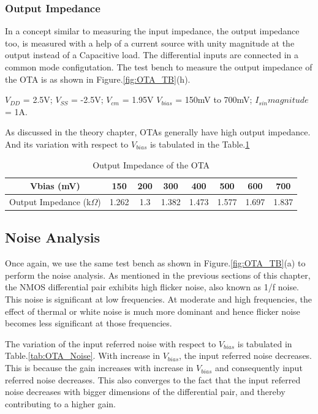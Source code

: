\subsubsection{Output Impedance}
In a concept similar to measuring the input impedance, the output impedance too, is measured with a help of a current source with unity magnitude at the output instead of a Capacitive load. The differential inputs are connected in a common mode configutation. The test bench to measure the output impedance of the OTA is as shown in Figure.\ref{fig:OTA_TB}(h).

$V_{DD}$ = 2.5V; $V_{SS}$ = -2.5V; $V_{cm}$ = 1.95V $V_{bias}$ = 150mV to 700mV; $I_{sin} magnitude$ = 1A. 
 
As discussed in the theory chapter, OTAs generally have high output impedance. And its variation with respect to $V_{bias}$ is tabulated in the Table.\ref{tab:OTA_ZOUT}
\begin{table} [H]
\centering
\begin{tabular}{@{}cccccccc@{}}
\toprule
Vbias (mV)					& 150		& 200			& 300			& 400			& 500			& 600			& 700 \\ \midrule
Output Impedance (k$\Omega$)			& 1.262		& 1.3		& 1.382		& 1.473		& 1.577		& 1.697		& 1.837 \\
\bottomrule
\end{tabular}
\caption{Output Impedance of the OTA}
\label{tab:OTA_ZOUT}
\end{table}

\subsection{Noise Analysis}

Once again, we use the same test bench as shown in Figure.\ref{fig:OTA_TB}(a) to perform the noise analysis. As mentioned in the previous sections of this chapter, the NMOS differential pair exhibits high flicker noise, also known as 1/f noise. This noise is significant at low frequencies. At moderate and high frequencies, the effect of thermal or white noise is much more dominant and hence flicker noise becomes less significant at those frequencies.

The variation of the input referred noise with respect to $V_{bias}$ is tabulated in Table.\ref{tab:OTA_Noise}. With increase in $V_{bias}$, the input referred noise decreases. This is because the gain increases with increase in $V_{bias}$ and consequently input referred noise decreases. This also converges to the fact that the input referred noise decreases with bigger dimensions of the differential pair, and thereby contributing to a higher gain.

